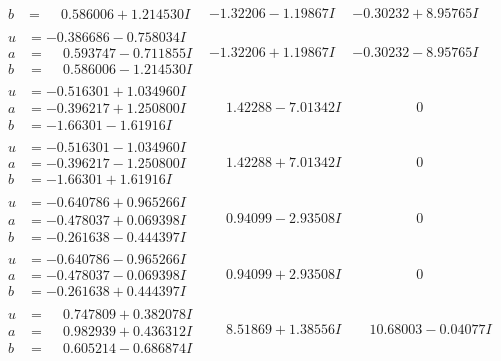 \documentclass[1p]{elsarticle_modified}
\theoremstyle{definition}
\begin{document}
$$\begin{array}{c|c|c}
\begin{aligned}
b &= \phantom{-}0.586006 + 1.214530 I\end{aligned}
 & -1.32206 - 1.19867 I & -0.30232 + 8.95765 I \\ \hline\begin{aligned}
u &= -0.386686 - 0.758034 I \\
a &= \phantom{-}0.593747 - 0.711855 I \\
b &= \phantom{-}0.586006 - 1.214530 I\end{aligned}
 & -1.32206 + 1.19867 I & -0.30232 - 8.95765 I \\ \hline\begin{aligned}
u &= -0.516301 + 1.034960 I \\
a &= -0.396217 + 1.250800 I \\
b &= -1.66301 - 1.61916 I\end{aligned}
 & \phantom{-}1.42288 - 7.01342 I & \phantom{-0.000000 } 0 \\ \hline\begin{aligned}
u &= -0.516301 - 1.034960 I \\
a &= -0.396217 - 1.250800 I \\
b &= -1.66301 + 1.61916 I\end{aligned}
 & \phantom{-}1.42288 + 7.01342 I & \phantom{-0.000000 } 0 \\ \hline\begin{aligned}
u &= -0.640786 + 0.965266 I \\
a &= -0.478037 + 0.069398 I \\
b &= -0.261638 - 0.444397 I\end{aligned}
 & \phantom{-}0.94099 - 2.93508 I & \phantom{-0.000000 } 0 \\ \hline\begin{aligned}
u &= -0.640786 - 0.965266 I \\
a &= -0.478037 - 0.069398 I \\
b &= -0.261638 + 0.444397 I\end{aligned}
 & \phantom{-}0.94099 + 2.93508 I & \phantom{-0.000000 } 0 \\ \hline\begin{aligned}
u &= \phantom{-}0.747809 + 0.382078 I \\
a &= \phantom{-}0.982939 + 0.436312 I \\
b &= \phantom{-}0.605214 - 0.686874 I\end{aligned}
 & \phantom{-}8.51869 + 1.38556 I & \phantom{-}10.68003 - 0.04077 I \\ \hline\begin{aligned}

\end{aligned}
\end{array}$$
\end{document}
